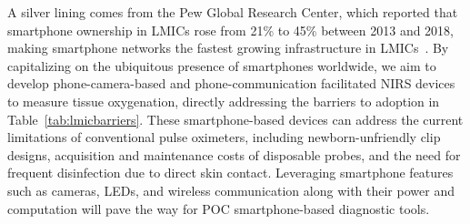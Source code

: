 A silver lining comes from the Pew Global Research Center, which reported that smartphone ownership in \ac{LMIC}s rose from 21\% to 45\% between 2013 and 2018, making smartphone networks the fastest growing infrastructure in LMICs~\cite{Poushter2016}. By capitalizing on the ubiquitous presence of smartphones worldwide, we aim to develop phone-camera-based and phone-communication facilitated NIRS devices to measure tissue oxygenation, directly addressing the barriers to adoption in Table~\ref{tab:lmicbarriers}. These smartphone-based devices can address the current limitations of conventional pulse oximeters, including newborn-unfriendly clip designs, acquisition and maintenance costs of disposable probes, and the need for frequent disinfection due to direct skin contact. Leveraging smartphone features such as cameras, LEDs, and wireless communication along with their power and computation will pave the way for POC smartphone-based diagnostic tools. 


